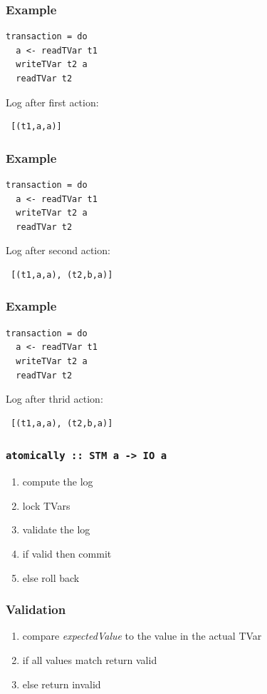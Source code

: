 \documentclass{beamer}
\begin{document}
  
\begin{frame}[fragile]
\frametitle{Example}
\begin{lstlisting} 
transaction = do
  a <- readTVar t1
  writeTVar t2 a
  readTVar t2
\end{lstlisting}
\vfill
\pause
Log after first action:
\begin{lstlisting}
 [(t1,a,a)]
\end{lstlisting}
\end{frame}
  
\begin{frame}[fragile]
\frametitle{Example}
\begin{lstlisting} 
transaction = do
  a <- readTVar t1
  writeTVar t2 a
  readTVar t2
\end{lstlisting}
\vfill
Log after second action:
\begin{lstlisting}
 [(t1,a,a), (t2,b,a)]
\end{lstlisting}
\end{frame}


\begin{frame}[fragile]
\frametitle{Example}
\begin{lstlisting} 
transaction = do
  a <- readTVar t1
  writeTVar t2 a
  readTVar t2
\end{lstlisting}
\vfill
Log after thrid action:
\begin{lstlisting}
 [(t1,a,a), (t2,b,a)]
\end{lstlisting}
\end{frame}
     
  \begin{frame}
   \frametitle{\lstinline{atomically :: STM a -> IO a}}
   \begin{enumerate}\setlength\itemsep{1em}
    \item compute the log
    \item lock TVars
    \item validate the log
    \item if valid then commit
    \item else roll back
   \end{enumerate}
  \end{frame}

  \begin{frame}
   \frametitle{Validation}
    \begin{enumerate}\setlength\itemsep{1em}
      \item compare \textit{expectedValue} to the value in the actual TVar
      \item if all values match return valid 
      \item else return invalid
    \end{enumerate}
  \end{frame}
\end{document}
